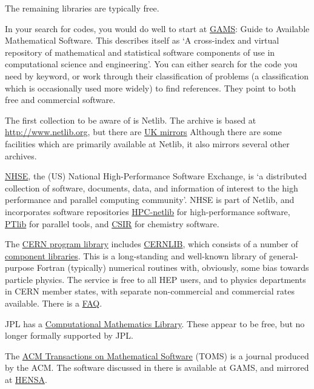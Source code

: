 \documentclass[11pt,oneside,chapters]{starlink}
\begin{document}
The remaining libraries are typically free.

In your search for codes, you would do well to start at
\href{http://gams.nist.gov}{GAMS}: Guide to
Available Mathematical Software.  This describes itself as
`A cross-index and virtual repository of mathematical and
statistical software components of use in computational
science and engineering'.  You can either search for the
code you need by keyword, or work through their
classification of problems (a classification which is
occasionally used more widely) to find references.  They
point to both free and commercial software.

The first collection to be aware of is Netlib.  The archive
is based at \url{http://www.netlib.org}, but there are
\href{http://www.netlib.org/bib/mirrors.html}{UK mirrors}
Although there are some facilities which
are primarily available at Netlib, it also mirrors several
other archives.

\href{http://www.nhse.org/}{NHSE}, the (US) National
High-Performance Software Exchange, is `a distributed
collection of software, documents, data, and information of interest
to the high performance and parallel computing community'.
NHSE is part of Netlib, and incorporates software repositories
\href{http://www.nhse.org/hpc-netlib/}{HPC-netlib}
for
high-performance software,
\href{http://www.nhse.org/ptlib/}{PTlib}
for parallel tools,
and \href{http://www.csir.org/}{CSIR}
for chemistry software.

The
\href{http://wwwinfo.cern.ch/asd/index.html}{CERN program library}
includes \href{http://wwwinfo.cern.ch/asd/cernlib/overview.html}{CERNLIB},
which consists of a number of
\href{http://wwwinfo.cern.ch/asd/cernlib/libraries.html}{component libraries}.
This is a long-standing and well-known
library of general-purpose Fortran (typically) numerical
routines with, obviously, some bias towards particle
physics.  The service is free to all HEP users, and to
physics departments in CERN member states, with separate
non-commercial and commercial rates available.  There is a
\href{http://wwwinfo.cern.ch/asdcgi/listcernlibfaqs.pl}{FAQ}.

JPL has a
\href{http://math.jpl.nasa.gov/}{Computational Mathematics Library}.
These appear to be free, but no longer
formally supported by JPL.

The
\href{http://math.nist.gov/toms/Overview.html}{ACM Transactions on Mathematical Software}
(TOMS) is a
journal produced by the ACM.  The software discussed in
there is available at GAMS, and mirrored at
\href{http://www.hensa.ac.uk/netlib/toms/}{HENSA}.
\end{document}
